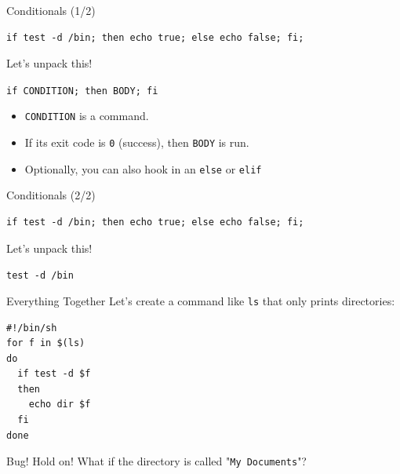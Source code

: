 \documentclass[12pt]{beamer}
\begin{document}
\begin{frame}[fragile]{Conditionals (1/2)}
  \begin{verbatim}
if test -d /bin; then echo true; else echo false; fi;
\end{verbatim}
  Let's unpack this!

  \texttt{if CONDITION; then BODY; fi}
  \begin{itemize}
    \item \texttt{CONDITION} is a command.
    \item If its exit code is \texttt{0} (success), then \texttt{BODY} is run.
    \item Optionally, you can also hook in an \texttt{else} or \texttt{elif}
  \end{itemize}
\end{frame}

\begin{frame}[fragile]{Conditionals (2/2)}
  \begin{verbatim}
if test -d /bin; then echo true; else echo false; fi;
\end{verbatim}
  Let's unpack this!

  \texttt{test -d /bin}
\end{frame}

\begin{frame}[fragile]{Everything Together}
  Let's create a command like \texttt{ls} that only prints directories:
  \begin{verbatim}
#!/bin/sh
for f in $(ls)
do
  if test -d $f
  then
    echo dir $f
  fi
done
\end{verbatim}
\end{frame}

\begin{frame}{Bug!}
  Hold on! What if the directory is called "\texttt{My Documents}"?
\end{frame}
\end{document}
